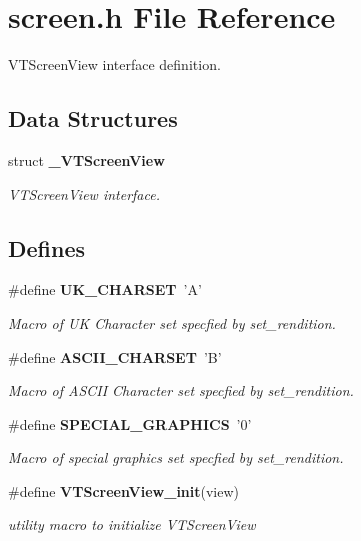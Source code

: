 \section{screen.h File Reference}
\label{screen_8h}
VTScreen\-View interface definition. 


\subsection*{Data Structures}
\begin{CompactItemize}
\item 
struct {\bf \_\-VTScreen\-View}
\begin{CompactList}\small\item\em VTScreen\-View interface.\item\end{CompactList}\end{CompactItemize}
\subsection*{Defines}
\begin{CompactItemize}
\item 
{}
\#define {\bf UK\_\-CHARSET}\ 'A'\label{screen_8h_a0}

\begin{CompactList}\small\item\em Macro of UK Character set specfied by set\_\-rendition.\item\end{CompactList}\item 
{}
\#define {\bf ASCII\_\-CHARSET}\ 'B'\label{screen_8h_a1}

\begin{CompactList}\small\item\em Macro of ASCII Character set specfied by set\_\-rendition.\item\end{CompactList}\item 
{}
\#define {\bf SPECIAL\_\-GRAPHICS}\ '0'\label{screen_8h_a2}

\begin{CompactList}\small\item\em Macro of special graphics set specfied by set\_\-rendition.\item\end{CompactList}\item 
\#define {\bf VTScreen\-View\_\-init}(view)
\begin{CompactList}\small\item\em utility macro to initialize VTScreen\-View\item\end{CompactList}\end{CompactItemize}
